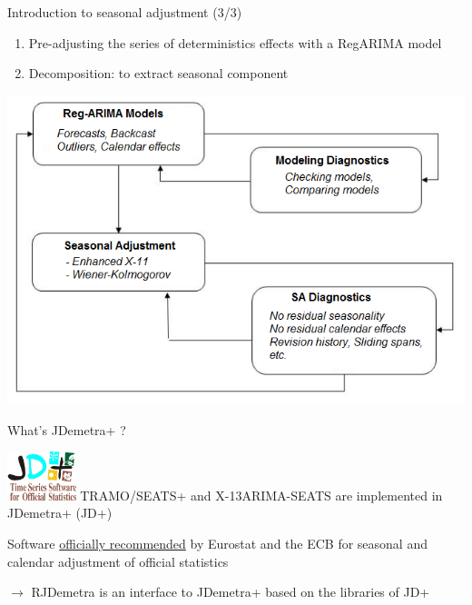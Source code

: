 \documentclass[10pt,xcolor=table,color={dvipsnames,usenames},ignorenonframetext,usepdftitle=false,french]{beamer}
\begin{document}
\begin{frame}{Introduction to seasonal adjustment (3/3)}
\protect\hypertarget{introduction-to-seasonal-adjustment-33}{}

\vspace{-0.15cm}

\begin{enumerate}
\item
  Pre-adjusting the series of deterministics effects with a RegARIMA
  model
\item
  Decomposition: to extract seasonal component
\end{enumerate}

\centering

\includegraphics[height=0.75\textheight]{img/sa_2_steps.png}

\end{frame}

\begin{frame}{What's JDemetra+ ?}
\protect\hypertarget{whats-jdemetra}{}

\includegraphics[width=2cm]{img/jdemetra+.jpg} TRAMO/SEATS+ and
X-13ARIMA-SEATS are implemented in JDemetra+ (JD+)

\bigskip

\large\faThumbsUp{} \normalsize Software
\href{https://ec.europa.eu/eurostat/cros/system/files/Jdemetra_\%20release.pdf}{officially
recommended} by Eurostat and the ECB for seasonal and calendar
adjustment of official statistics

\bigskip

\(\rightarrow\) RJDemetra is an \large\faRProject{}
\normalsize interface to JDemetra+ based on the \large\faJava{}
\normalsize libraries of JD+

\end{frame}
\end{document}
